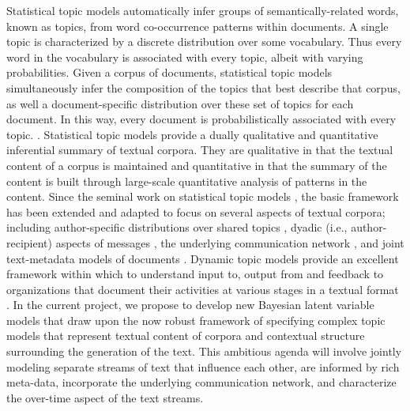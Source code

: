 Statistical topic models automatically infer groups of semantically-related words, known as topics, from word co-occurrence patterns within documents. A single topic is characterized by a discrete distribution over some vocabulary. Thus every word in the vocabulary is associated with every topic, albeit with varying probabilities. Given a corpus of documents, statistical topic models simultaneously infer the composition of the topics that best describe that corpus, as well a document-specific distribution over these set of topics for each document. In this way, every document is probabilistically associated with every topic.  \cite{Blei2010}. Statistical topic models provide a dually qualitative and quantitative inferential summary of textual corpora. They are qualitative in that the textual content of a corpus is maintained and quantitative in that the summary of the content is built through large-scale quantitative analysis of patterns in the content.  Since the seminal work on statistical topic models \cite{Blei2003}, the basic framework has been extended and adapted to focus on several aspects of textual corpora; including author-specific distributions over shared topics \cite{Steyvers2004}, dyadic (i.e., author-recipient) aspects of messages \cite{McCallum2005}, the underlying communication network \cite{Krafft2012}, and joint text-metadata models of documents \cite{Mimno2008}. Dynamic topic models \cite{Blei2006} provide an excellent framework within which to understand input to, output from and feedback to organizations that document their activities at various stages in a textual format . In the current project, we propose to develop new Bayesian latent variable models that draw upon the now robust framework of specifying complex topic models that represent textual content of corpora and contextual structure surrounding the generation of the text. This ambitious agenda will involve jointly modeling separate streams of text that influence each other, are informed by rich meta-data, incorporate the underlying communication network, and characterize the over-time aspect of the text streams.




